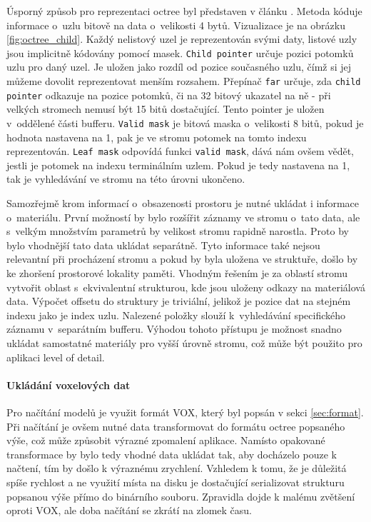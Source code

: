Úsporný způsob pro reprezentaci octree byl představen v článku \cite{Laine2011EfficientSV}. Metoda kóduje informace o~uzlu bitově na data o~velikosti 4 bytů. Vizualizace je na obrázku \ref{fig:octree_child}. Každý nelistový uzel je reprezentován svými daty, listové uzly jsou implicitně kódovány pomocí masek. \texttt{Child pointer} určuje pozici potomků uzlu pro daný uzel. Je uložen jako rozdíl od pozice současného uzlu, čímž si jej můžeme dovolit reprezentovat menším rozsahem. Přepínač \texttt{far} určuje, zda \texttt{child pointer} odkazuje na pozice potomků, či na 32 bitový ukazatel na ně - při velkých stromech nemusí být 15 bitů dostačující. Tento pointer je uložen v~oddělené části bufferu. \texttt{Valid mask} je bitová maska o~velikosti 8 bitů, pokud je hodnota nastavena na 1, pak je ve stromu potomek na tomto indexu reprezentován. \texttt{Leaf mask} odpovídá funkci \texttt{valid mask}, dává nám ovšem vědět, jestli je potomek na indexu terminálním uzlem. Pokud je tedy nastavena na 1, tak je vyhledávání ve stromu na této úrovni ukončeno.

Samozřejmě krom informací o~obsazenosti prostoru je nutné ukládat i informace o~materiálu. První možností by bylo rozšířit záznamy ve stromu o~tato data, ale s~velkým množstvím parametrů by velikost stromu rapidně narostla. Proto by bylo vhodnější tato data ukládat separátně. Tyto informace také nejsou relevantní při procházení stromu a pokud by byla uložena ve struktuře, došlo by ke zhoršení prostorové lokality paměti. Vhodným řešením je za oblastí stromu vytvořit oblast s~ekvivalentní strukturou, kde jsou uloženy odkazy na materiálová data. Výpočet offsetu do struktury je triviální, jelikož je pozice dat na stejném indexu jako je index uzlu. Nalezené položky slouží k~vyhledávání specifického záznamu v~separátním bufferu. Výhodou tohoto přístupu je možnost snadno ukládat samostatné materiály pro vyšší úrovně stromu, což může být použito pro aplikaci level of detail.

\paragraph{Ukládání voxelových dat} Pro načítání modelů je využit formát VOX, který byl popsán v sekci \ref{sec:format}. Při načítání je ovšem nutné data transformovat do formátu octree popsaného výše, což může způsobit výrazné zpomalení aplikace. Namísto opakované transformace by bylo tedy vhodné data ukládat tak, aby docházelo pouze k načtení, tím by došlo k výraznému zrychlení. Vzhledem k tomu, že je důležitá spíše rychlost a ne využití místa na disku je dostačující serializovat strukturu popsanou výše přímo do binárního souboru. Zpravidla dojde k malému zvětšení oproti VOX, ale doba načítání se zkrátí na zlomek času.

